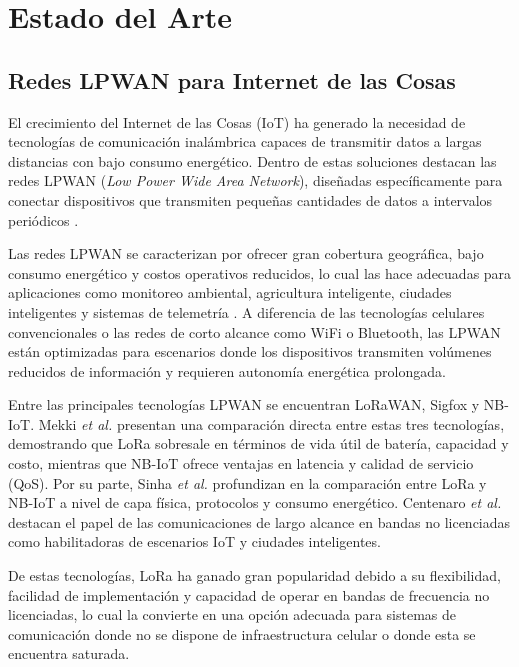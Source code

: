 \chapter{Estado del Arte}\label{estarte}
\section{Redes LPWAN para Internet de las Cosas}
\label{sec:lpwan}

El crecimiento del Internet de las Cosas (IoT) ha generado la necesidad de tecnologías de comunicación inalámbrica capaces de transmitir datos a largas distancias con bajo consumo energético. Dentro de estas soluciones destacan las redes LPWAN (\textit{Low Power Wide Area Network}), diseñadas específicamente para conectar dispositivos que transmiten pequeñas cantidades de datos a intervalos periódicos \cite{raza2017lpwan}.

Las redes LPWAN se caracterizan por ofrecer gran cobertura geográfica, bajo consumo energético y costos operativos reducidos, lo cual las hace adecuadas para aplicaciones como monitoreo ambiental, agricultura inteligente, ciudades inteligentes y sistemas de telemetría \cite{qadir2018lpwan}. A diferencia de las tecnologías celulares convencionales o las redes de corto alcance como WiFi o Bluetooth, las LPWAN están optimizadas para escenarios donde los dispositivos transmiten volúmenes reducidos de información y requieren autonomía energética prolongada.

Entre las principales tecnologías LPWAN se encuentran LoRaWAN, Sigfox y NB-IoT. Mekki \textit{et al.} \cite{mekki2019comparative} presentan una comparación directa entre estas tres tecnologías, demostrando que LoRa sobresale en términos de vida útil de batería, capacidad y costo, mientras que NB-IoT ofrece ventajas en latencia y calidad de servicio (QoS). Por su parte, Sinha \textit{et al.} \cite{sinha2017survey} profundizan en la comparación entre LoRa y NB-IoT a nivel de capa física, protocolos y consumo energético. Centenaro \textit{et al.} \cite{centenaro2016longrange} destacan el papel de las comunicaciones de largo alcance en bandas no licenciadas como habilitadoras de escenarios IoT y ciudades inteligentes.

De estas tecnologías, LoRa ha ganado gran popularidad debido a su flexibilidad, facilidad de implementación y capacidad de operar en bandas de frecuencia no licenciadas, lo cual la convierte en una opción adecuada para sistemas de comunicación donde no se dispone de infraestructura celular o donde esta se encuentra saturada.

